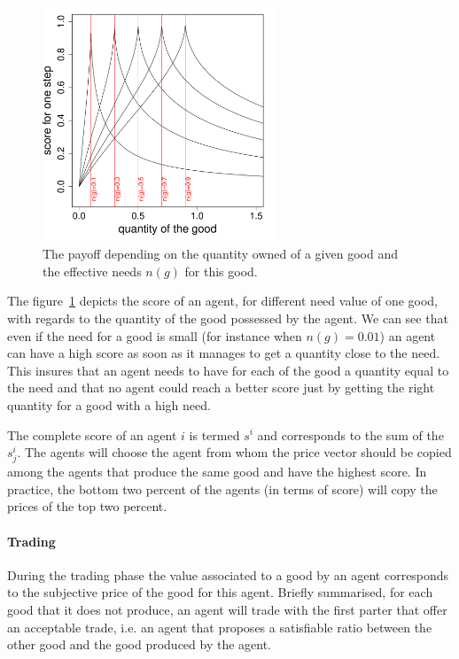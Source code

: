 \documentclass{wscpaperproc}
\begin{document}
\begin{figure}[htp]
	\begin{center}
		\includegraphics[width=7cm]{img/fitness.pdf}
	\end{center}
	\caption{The payoff depending on the quantity owned of a given good and the effective needs $n(g)$ for this good.}
	\label{fig:fit}
\end{figure}
The figure~\ref{fig:fit} depicts the score of an agent, for different need value of one good, with regards to the quantity of the good possessed by the agent. We can see that even if the need for a good is small (for instance when $n(g) = 0.01$) an agent can have a high score as soon as it manages to get a quantity close to the need. This insures that an agent needs to have for each of the good a quantity equal to the need and that no agent could reach a better score just by getting the right quantity for a good with a high need.

The complete score of an agent $i$ is termed $s^i$ and corresponds to the sum of the $s^i_j$. The agents will choose the agent from whom the price vector should be copied among the agents that produce the same good and have the highest score. In practice, the bottom two percent of the agents (in terms of score) will copy the prices of the top two percent.


\paragraph{Trading} 
During the trading phase the value associated to a good by an agent corresponds to the subjective price of the good for this agent. Briefly summarised, for each good that it does not produce, an agent will trade with the first parter that offer an acceptable trade, i.e. an agent that proposes a satisfiable ratio between the other good and the good produced by the agent. 
\end{document}
